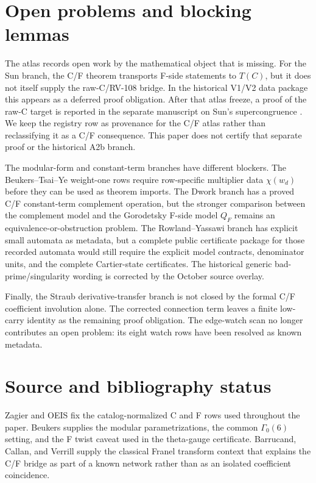 \documentclass[11pt,a4paper]{article}
\begin{document}
\section{Open problems and blocking lemmas}
\label{app:open-problems}

The atlas records open work by the mathematical object that is missing.  For
the Sun branch, the C/F theorem transports F-side statements to $T(C)$, but it
does not itself supply the raw-C/RV-108 bridge.  In the historical V1/V2 data
package this appears as a deferred proof obligation.  After that atlas freeze,
a proof of the raw-C target is reported in the
separate manuscript on Sun's supercongruence
\cite{babanskyy_2026_sun35_bridge}.  We keep the registry row as provenance
for the C/F atlas rather than reclassifying it as a C/F consequence.
This paper does not certify that separate proof or the historical A2b branch.

The modular-form and constant-term branches have different blockers.  The
Beukers--Tsai--Ye weight-one rows require row-specific multiplier data
$\chi(w_d)$ before they can be used as theorem imports.  The Dwork branch has
a proved C/F constant-term complement operation, but the stronger comparison
between the complement model and the Gorodetsky F-side model $Q_F$ remains an
equivalence-or-obstruction problem.  The Rowland--Yassawi branch has explicit
small automata as metadata, but a complete public certificate package for
those recorded automata would still
require the explicit model contracts, denominator units, and the complete
Cartier-state certificates.  The historical generic bad-prime/singularity
wording is corrected by the October source overlay.

Finally, the Straub derivative-transfer branch is not closed by the formal
C/F coefficient involution alone.  The corrected connection term leaves a
finite low-carry identity as the remaining proof obligation.  The edge-watch
scan no longer contributes an open problem: its eight watch rows have been
resolved as known metadata.

\section{Source and bibliography status}
\label{app:sources}

Zagier and OEIS fix the catalog-normalized C and F rows used throughout the
paper.  Beukers supplies the modular parametrizations, the common
$\Gamma_0(6)$ setting, and the F twist caveat used in the theta-gauge
certificate.  Barrucand, Callan, and Verrill supply the classical Franel
transform context that explains the C/F bridge as part of a known network
rather than as an isolated coefficient coincidence.
\end{document}

